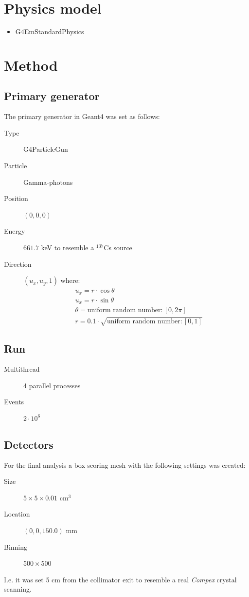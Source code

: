 \documentclass[a4paper]{article}
\begin{document}
\section{Physics model}
\begin{itemize}
  \item G4EmStandardPhysics
\end{itemize}


\section{Method}
\subsection{Primary generator}
The primary generator in Geant4 was set as follows:
\begin{description}
  \item[Type] G4ParticleGun
  \item[Particle] Gamma-photons
  \item[Position] $(0,0,0)$
  \item[Energy] $661.7$ keV to resemble a $^{137}$Cs source
  \item[Direction] $(u_x, u_y, 1)$ where:
  \begin{align}
    &u_x = r \cdot \cos \theta \\
    &u_x = r \cdot \sin \theta \\
    &\theta = \text{uniform random number}: [0, 2\pi] \\
    &r = 0.1 \cdot \sqrt{\text{uniform random number}: [0, 1]}
    \label{eq:GDir}
  \end{align}
\end{description}
\subsection{Run}
\begin{description}
  \item[Multithread] 4 parallel processes
  \item[Events] $2\cdot 10^6$
\end{description}

\subsection{Detectors}
For the final analysis a box scoring mesh with the following settings was created:
\begin{description}
  \item[Size] $5\times5\times0.01$ cm$^3$
  \item[Location] $(0, 0, 150.0)$ mm
  \item[Binning] $500\times500$
\end{description}
I.e. it was set 5 cm from the collimator exit to resemble a real \textit{Compex} crystal scanning.
\end{document}
